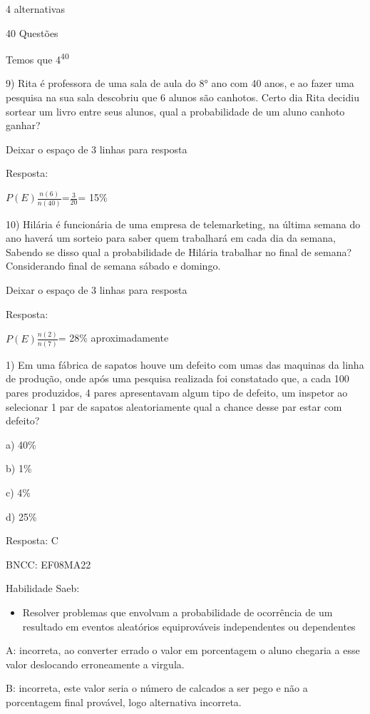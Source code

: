 {4 alternativas

40 Questões

Temos que 4\textsuperscript{40}

9) Rita é professora de uma sala de aula do 8° ano com 40 anos, e ao
fazer uma pesquisa na sua sala descobriu que 6 alunos são canhotos.
Certo dia Rita decidiu sortear um livro entre seus alunos, qual a
probabilidade de um aluno canhoto ganhar?

Deixar o espaço de 3 linhas para resposta

Resposta:

\(P(E)\frac{n(6)}{n(40)}\)=\(\frac{3}{20}\)= 15\%

10) Hilária é funcionária de uma empresa de telemarketing, na última
semana do ano haverá um sorteio para saber quem trabalhará em cada dia
da semana, Sabendo se disso qual a probabilidade de Hilária trabalhar no
final de semana? Considerando final de semana sábado e domingo.

Deixar o espaço de 3 linhas para resposta

Resposta:

\(P(E)\frac{n(2)}{n(7)}\)= 28\% aproximadamente


1) Em uma fábrica de sapatos houve um defeito com umas das maquinas da
linha de produção, onde após uma pesquisa realizada foi constatado que,
a cada 100 pares produzidos, 4 pares apresentavam algum tipo de defeito,
um inspetor ao selecionar 1 par de sapatos aleatoriamente qual a chance
desse par estar com defeito?

a) 40\%

b) 1\%

c) 4\%

d) 25\%

Resposta: C

BNCC: EF08MA22

Habilidade Saeb:

\begin{itemize}
\tightlist
\item
  Resolver problemas que envolvam a probabilidade de ocorrência de um
  resultado em eventos aleatórios equiprováveis independentes ou
  dependentes
\end{itemize}

A: incorreta, ao converter errado o valor em porcentagem o aluno
chegaria a esse valor deslocando erroneamente a virgula.

B: incorreta, este valor seria o número de calcados a ser pego e não a
porcentagem final provável, logo alternativa incorreta.

}
